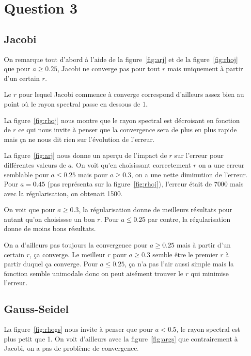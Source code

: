 \section{Question 3}

\subsection{Jacobi}
On remarque tout d'abord à l'aide de la figure~\ref{fig:arj}
et de la figure~\ref{fig:rhoj} que pour $a \geq 0.25$,
Jacobi ne converge pas pour tout $r$ mais uniquement à partir
d'un certain $r$.

Le $r$ pour lequel Jacobi commence à converge correspond d'ailleurs
assez bien au point où le rayon spectral passe en dessous de 1.

La figure~\ref{fig:rhoj} nous montre que le rayon spectral est
décroisant en fonction de $r$ ce qui nous invite à penser que
la convergence sera de plus en plus rapide mais ça ne nous
dit rien sur l'évolution de l'erreur.

La figure~\ref{fig:arj} nous donne un aperçu de l'impact de $r$
sur l'erreur pour différentes valeurs de $a$.
On voit qu'en choisissant correctement $r$ on a une erreur semblable
pour $a \leq 0.25$ mais pour $a \geq 0.3$, on a une nette
diminution de l'erreur.
Pour $a = 0.45$ (pas représenta sur la figure~\ref{fig:rhoj}),
l'erreur était de 7000 mais avec la régularisation, on obtenait
1500.

On voit que pour $a \geq 0.3$, la régularisation donne de meilleurs résultats
pour autant qu'on choisissse un bon $r$.
Pour $a \leq 0.25$ par contre, la régularisation donne de moins bons résultats.

On a d'ailleurs pas toujours la convergence pour $a \geq 0.25$ mais à partir
d'un certain $r$, ça converge.
Le meilleur $r$ pour $a \geq 0.3$ semble être le premier $r$ à partir duquel
ça converge.
Pour $a \leq 0.25$, ça n'a pas l'air aussi simple mais la fonction semble
unimodale donc on peut aisément trouver le $r$ qui minimise l'erreur.

\subsection{Gauss-Seidel}
La figure~\ref{fig:rhogs} nous invite à penser que pour
$a < 0.5$, le rayon spectral est plus petit que 1.
On voit d'ailleurs avec la figure~\ref{fig:args} que contrairement
à Jacobi, on a pas de problème de convergence.

